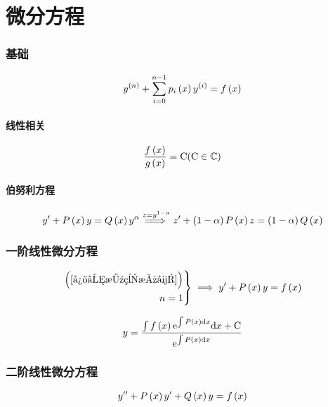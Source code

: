 \documentclass{article}
\begin{document}
\part{微分方程}

\section{基础}

\begin{definition}[$n$阶线性微分方程]
    \[y^{\left(n\right)}+\sum_{i=0}^{n-1}p_i\left(x\right)y^{\left(i\right)}=f\left(x\right)\label{微分方程总式}\]
\end{definition}

\subsection{线性相关}

\[\frac{f\left(x\right)}{g\left(x\right)}=\mathrm C(\mathrm C\in\mathbb C)\]

\subsection{伯努利方程}
\[y^\prime+P\left(x\right)y=Q\left(x\right)y^\alpha\overset{z=y^{1-\alpha}}{=\!\!\!\implies} z^\prime+\left(1-\alpha\right)P\left(x\right)z=\left(1-\alpha\right)Q\left(x\right)\]
\section{一阶线性微分方程}

\begin{definition}
    \[\left.\begin{aligned}
            \left(\ref{微分方程总式}\right) \\
            n=1
        \end{aligned}\right\}
        \implies
        y^\prime+P\left(x\right)y=f\left(x\right)\]
\end{definition}

\begin{theorem}[通解]
    \[y=\frac{\int{f\left(x\right)\mathrm e^{\int P\left(x\right)\mathrm dx}\mathrm dx}+\mathrm C}{\mathrm e^{\int P\left(x\right)\mathrm d x}}\]
\end{theorem}

\section{二阶线性微分方程}

\begin{definition}[]
    \[y^{\prime\prime}+P\left(x\right)y^\prime+Q\left(x\right)y=f\left(x\right)\]
\end{definition}
\end{document}
